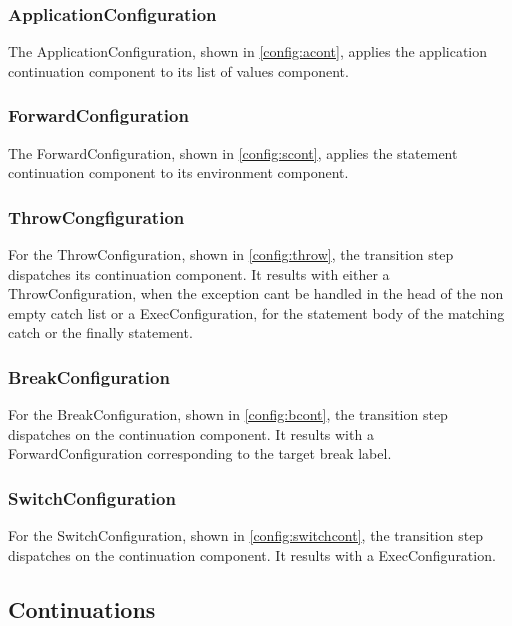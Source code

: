 \documentclass{article}
\begin{document}
\subsubsection{ApplicationConfiguration}
\label{subsubsec:applicationconfig}

The ApplicationConfiguration, shown in \ref{config:acont}, applies the application continuation component to its list of values component.

\subsubsection{ForwardConfiguration}
\label{subsubsec:forwardconfig}

The ForwardConfiguration, shown in \ref{config:scont}, applies the statement continuation component to its environment component.

\subsubsection{ThrowCongfiguration}
\label{subsubsec:throwconfig}

For the ThrowConfiguration, shown in \ref{config:throw}, the transition step dispatches its continuation component.
It results with either a ThrowConfiguration, when  the exception cant be handled in the head of the non empty catch list or a ExecConfiguration, for the statement body of the matching catch or the finally statement.

\subsubsection{BreakConfiguration}
\label{subsubsec:breakconfig}

For the BreakConfiguration, shown in \ref{config:bcont}, the transition step dispatches on the continuation component.
It results with a ForwardConfiguration corresponding to the target break label.

\subsubsection{SwitchConfiguration}
\label{subsubsec:switchconfig}

For the SwitchConfiguration, shown in \ref{config:switchcont}, the transition step dispatches on the continuation component.
It results with a ExecConfiguration.

\subsection{Continuations}
\label{subsec:continuations-definition}
\end{document}
